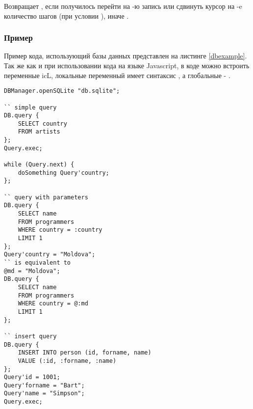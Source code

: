 Возвращает \true, если получилось перейти на -ю запись или сдвинуть курсор на -e количество шагов (при условии ), иначе \false.

\subsubsection{Пример}

Пример кода, использующий базы данных представлен на листинге \ref{dbexample}. Так же как и при использовании кода на языке Javascript, в коде можно встроить переменные icL, локальные переменный имеет синтаксис , а глобальные - .

\begin{lstlisting}[caption=Пример кода использующий базу данных, label=dbexample]
DBManager.openSQLite "db.sqlite";

`` simple query
DB.query {
	SELECT country
	FROM artists
};
Query.exec;

while (Query.next) {
    doSomething Query'country;
};

`` query with parameters
DB.query {
	SELECT name
	FROM programmers
	WHERE country = :country
	LIMIT 1
};
Query'country = "Moldova";
`` is equivalent to
@md = "Moldova";
DB.query {
	SELECT name
	FROM programmers
	WHERE country = @:md
	LIMIT 1
};

`` insert query
DB.query {
	INSERT INTO person (id, forname, name)
	VALUE (:id, :forname, :name)
};
Query'id = 1001;
Query'forname = "Bart";
Query'name = "Simpson";
Query.exec;
\end{lstlisting}

